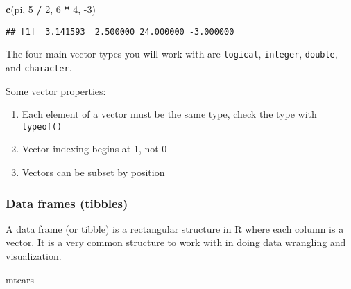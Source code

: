 \documentclass[
]{article}
\newenvironment{Shaded}{\begin{snugshade}}{\end{snugshade}}
\newcommand{\DecValTok}[1]{\textcolor[rgb]{0.00,0.00,0.81}{#1}}
\newcommand{\KeywordTok}[1]{\textcolor[rgb]{0.13,0.29,0.53}{\textbf{#1}}}
\newcommand{\NormalTok}[1]{#1}
\newcommand{\OperatorTok}[1]{\textcolor[rgb]{0.81,0.36,0.00}{\textbf{#1}}}
\newcommand{\StringTok}[1]{\textcolor[rgb]{0.31,0.60,0.02}{#1}}
\begin{document}
\begin{Shaded}
\begin{Highlighting}[]
\KeywordTok{c}\NormalTok{(pi, }\DecValTok{5} \OperatorTok{/}\StringTok{ }\DecValTok{2}\NormalTok{, }\DecValTok{6} \OperatorTok{*}\StringTok{ }\DecValTok{4}\NormalTok{, }\DecValTok{-3}\NormalTok{)}
\end{Highlighting}
\end{Shaded}

\begin{verbatim}
## [1]  3.141593  2.500000 24.000000 -3.000000
\end{verbatim}

The four main vector types you will work with are \texttt{logical},
\texttt{integer}, \texttt{double}, and \texttt{character}.

Some vector properties:

\begin{enumerate}
\def\labelenumi{\arabic{enumi}.}
\item
  Each element of a vector must be the same type, check the type with
  \texttt{typeof()}
\item
  Vector indexing begins at 1, not 0
\item
  Vectors can be subset by position
\end{enumerate}

\hypertarget{data-frames-tibbles}{%
\subsubsection{Data frames (tibbles)}\label{data-frames-tibbles}}

A data frame (or tibble) is a rectangular structure in R where each
column is a vector. It is a very common structure to work with in doing
data wrangling and visualization.

\begin{Shaded}
\begin{Highlighting}[]
\NormalTok{mtcars}
\end{Highlighting}
\end{Shaded}
\end{document}

